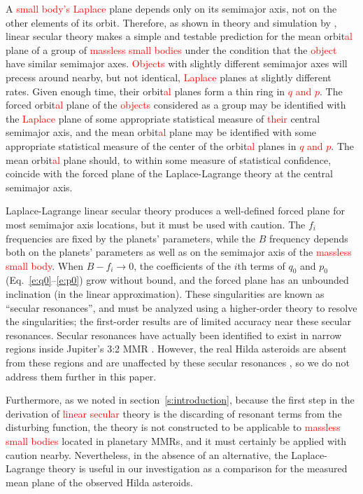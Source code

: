 \documentclass[a4paper,fleqn]{cas-sc}
\begin{document}
\begin{linenumbers}
A \textcolor{red}{small body's} \textcolor{red}{Laplace} plane depends only on its semimajor axis, not on the other elements of its orbit.
Therefore, as shown in theory and simulation by \citet{cc08}, linear secular theory makes a simple and testable prediction for the mean orbit\textcolor{red}{al} plane of a group of \textcolor{red}{massless small bodies} under the condition that the \textcolor{red}{object} have similar semimajor axes.
\textcolor{red}{Objects} with slightly different semimajor axes will precess around nearby, but not identical, \textcolor{red}{Laplace} planes at slightly different rates.
Given enough time, their orbit\textcolor{red}{al} planes form a thin ring in \textcolor{red}{$q$ and $p$}.
The forced orbit\textcolor{red}{al} plane of the \textcolor{red}{objects} considered as a group may be identified with the \textcolor{red}{Laplace} plane of some appropriate statistical measure of \textcolor{red}{their} central semimajor axis, and the mean orbit\textcolor{red}{al} plane may be identified with some appropriate statistical measure of the center of the orbit\textcolor{red}{al} planes in \textcolor{red}{$q$ and $p$}.
The mean orbit\textcolor{red}{al} plane should, to within some measure of statistical confidence, coincide with the forced plane of the Laplace-Lagrange theory at the central semimajor axis.

Laplace-Lagrange linear secular theory produces a well-defined forced plane for most semimajor axis locations, but it must be used with caution.
The $f_i$ frequencies are fixed by the planets' parameters, while the $B$ frequency depends both on the planets' parameters as well as on the semimajor axis of the \textcolor{red}{massless small body}.
When $B-f_i\rightarrow0$, the coefficients of the $i$th terms of $q_0$ and $p_0$ (Eq.~\ref{e:q0}--\ref{e:p0}) grow without bound, and the forced plane has an unbounded inclination (in the linear approximation).
These singularities are known as ``secular resonances'', and must be analyzed using a higher-order theory to resolve the singularities; 
the first-order results are of limited accuracy near these secular resonances. 
Secular resonances have actually been identified to exist in narrow regions inside Jupiter's 3:2 MMR \citep[e.g.,][]{Morbidelli:1993,Ferraz-Mello:1998}. 
However, the real Hilda asteroids are absent from these regions and are unaffected by these secular resonances \citep{morbidelli1993secular,zain2025collisional,nesvorny1997asteroidal}, so we do not address them further in this paper.

Furthermore, as we noted in section~\ref{s:introduction}, because the first step in the derivation of \textcolor{red}{linear secular} theory is the discarding of resonant terms from the disturbing function, the theory is not constructed to be applicable to \textcolor{red}{massless small bodies} located in planetary MMRs, and it must certainly be applied with caution nearby.
Nevertheless, in the absence of an alternative, the Laplace-Lagrange theory is useful in our investigation as a comparison for the measured mean plane of the observed Hilda asteroids. 


\end{linenumbers}
\end{document}
